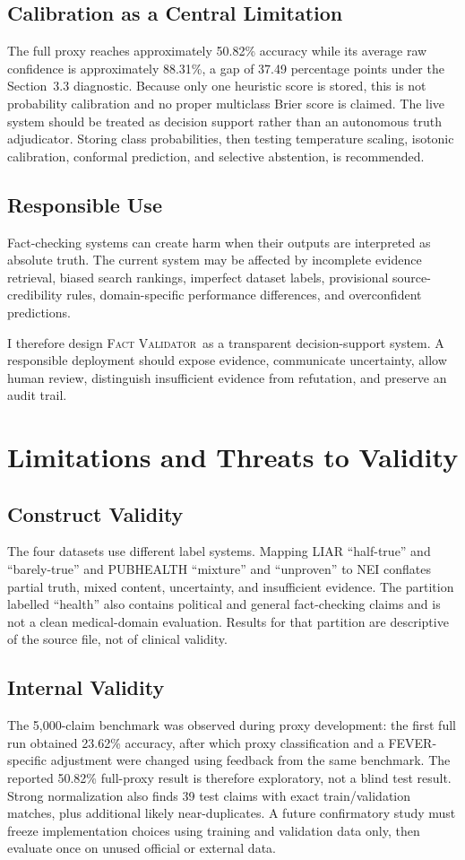 \documentclass[12pt,a4paper,openany]{report}
\newcommand{\system}{\textsc{Fact Validator}}
\begin{document}
\section{Calibration as a Central Limitation}
The full proxy reaches approximately 50.82\% accuracy while its average raw confidence is approximately 88.31\%, a gap of 37.49 percentage points under the Section~3.3 diagnostic. Because only one heuristic score is stored, this is not probability calibration and no proper multiclass Brier score is claimed. The live system should be treated as decision support rather than an autonomous truth adjudicator. Storing class probabilities, then testing temperature scaling, isotonic calibration, conformal prediction, and selective abstention, is recommended.

\section{Responsible Use}
Fact-checking systems can create harm when their outputs are interpreted as absolute truth. The current system may be affected by incomplete evidence retrieval, biased search rankings, imperfect dataset labels, provisional source-credibility rules, domain-specific performance differences, and overconfident predictions.

I therefore design \system\ as a transparent decision-support system. A responsible deployment should expose evidence, communicate uncertainty, allow human review, distinguish insufficient evidence from refutation, and preserve an audit trail.

\chapter{Limitations and Threats to Validity}
\section{Construct Validity}
The four datasets use different label systems. Mapping LIAR ``half-true'' and
``barely-true'' and PUBHEALTH ``mixture'' and ``unproven'' to NEI conflates
partial truth, mixed content, uncertainty, and insufficient evidence. The
partition labelled ``health'' also contains political and general
fact-checking claims and is not a clean medical-domain evaluation. Results for
that partition are descriptive of the source file, not of clinical validity.

\section{Internal Validity}
The 5{,}000-claim benchmark was observed during proxy development: the first
full run obtained 23.62\% accuracy, after which proxy classification and a
FEVER-specific adjustment were changed using feedback from the same benchmark.
The reported 50.82\% full-proxy result is therefore exploratory, not a blind
test result. Strong normalization also finds 39 test claims with exact
train/validation matches, plus additional likely near-duplicates. A future
confirmatory study must freeze implementation choices using training and
validation data only, then evaluate once on unused official or external data.
\end{document}
